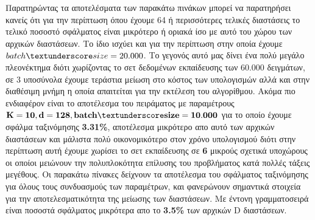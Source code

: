Παρατηρώντας τα αποτελέσματα των παρακάτω πινάκων μπορεί να παρατηρήσει κανείς ότι για την περίπτωση όπου έχουμε 64 ή περισσότερες τελικές διαστάσεις το τελικό ποσοστό σφάλματος είναι μικρότερο ή οριακά ίσο με αυτό του χώρου των αρχικών διαστάσεων. Το ίδιο ισχύει και για την περίπτωση στην οποία έχουμε $batch\textunderscore size=20.000$. Το γεγονός αυτό μας δίνει ένα πολύ μεγάλο πλεονέκτημα διότι χωρίζοντας το σετ δεδομένων εκπαίδευσης των 60.000 δειγμάτων, σε 3 υποσύνολα έχουμε τεράστια μείωση στο κόστος των υπολογισμών αλλά και στην διαθέσιμη μνήμη η οποία απαιτείται για την εκτέλεση του αλγορίθμου. Ακόμα πιο ενδιαφέρον είναι το αποτέλεσμα του πειράματος με παραμέτρους $\mathbf{K=10, d=128, batch\textunderscore size=10.000}$ για το οποίο έχουμε σφάλμα ταξινόμησης \textbf{3.31\%}, αποτέλεσμα μικρότερο απο αυτό των αρχικών διαστάσεων και μάλιστα πολύ οικονομικότερο στον χρόνο υπολογισμού διότι στην περίπτωση αυτή έχουμε χωρίσει το σετ εκπαίδευσης σε \textbf{6} μικρούς σχετικά υποχώρους οι οποίοι μειώνουν την πολυπλοκότητα επίλυσης του προβλήματος κατά πολλές τάξεις μεγέθους. Οι παρακάτω πίνακες δείχνουν τα αποτέλεσμα του σφάλματος ταξινόμησης για όλους τους συνδυασμούς των παραμέτρων, και φανερώνουν σημαντικά στοιχεία για την αποτελεσματικότητα της μείωσης των διαστάσεων. Με έντονη γραμματοσειρά είναι ποσοστά σφάλματος μικρότερα απο το \textbf{3.5\%} των αρχικών \textlatin{D} διαστάσεων.

